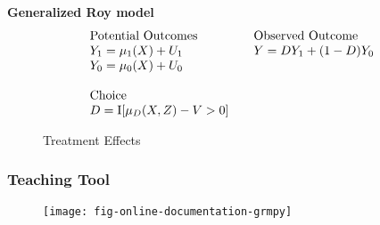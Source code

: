 \begin{frame}
	\textbf{Generalized Roy model}
	\begin{align*}\begin{array}{l@{\qquad}l}
			\text{Potential Outcomes} &\text{Observed Outcome}\\
			Y_1 = \mu_1(X) + U_1      &  Y = D Y_1 + (1 - D)Y_0 \\
			Y_0 = \mu_0(X) + U_0      &\\
			& \\
			\text{Choice} & \\
			D = \mathrm{I}[\mu_D(X, Z) - V > 0] & \\
		\end{array}
	\end{align*}
\end{frame}
\begin{frame}
	\begin{figure}[htp]\centering
		\caption{Treatment Effects}
	\end{figure}
\end{frame}
\begin{frame}
	\frametitle{Teaching Tool}
	\begin{figure}[htp]\centering
		\texttt{[image: fig-online-documentation-grmpy]}
	\end{figure}
\end{frame}
